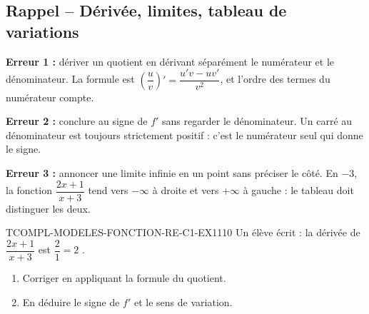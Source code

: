 

\subsection*{Rappel -- Dérivée, limites, tableau de variations}

\textbf{Erreur 1 :} dériver un quotient en dérivant séparément le numérateur
et le dénominateur. La formule est
$\left(\dfrac{u}{v}\right)'=\dfrac{u'v-uv'}{v^2}$, et l'ordre des termes du
numérateur compte.

\textbf{Erreur 2 :} conclure au signe de $f'$ sans regarder le dénominateur.
Un carré au dénominateur est toujours strictement positif : c'est le
numérateur seul qui donne le signe.

\textbf{Erreur 3 :} annoncer une limite infinie en un point sans préciser le
côté. En $-3$, la fonction $\dfrac{2x+1}{x+3}$ tend vers $-\infty$ à droite et
vers $+\infty$ à gauche : le tableau doit distinguer les deux.


\begin{exercice}{TCOMPL-MODELES-FONCTION-RE-C1-EX1}{1}{10}
Un élève écrit : \og la dérivée de $\dfrac{2x+1}{x+3}$ est $\dfrac{2}{1}=2$ \fg.
\begin{enumerate}
  \item Corriger en appliquant la formule du quotient.
  \item En déduire le signe de $f'$ et le sens de variation.
\end{enumerate}
\end{exercice}
